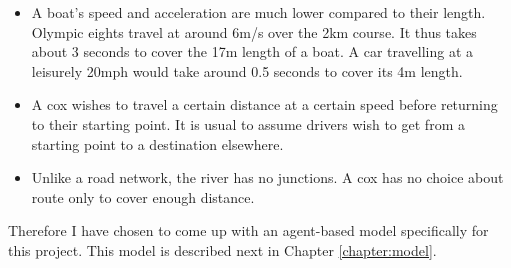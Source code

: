       \begin{itemize}
        \item A boat's speed and acceleration are much lower compared to their length. Olympic eights travel at around 6m/s over the 2km course. It thus takes about 3 seconds to cover the 17m length of a boat. A car travelling at a leisurely 20mph would take around 0.5 seconds to cover its 4m length.
        
        \item A cox wishes to travel a certain distance at a certain speed before returning to their starting point. It is usual to assume drivers wish to get from a starting point to a destination elsewhere. 
        
        \item Unlike a road network, the river has no junctions. A cox has no choice about route only to cover enough distance.
      \end{itemize}
  
  Therefore I have chosen to come up with an agent-based model specifically for this project. This model is described next in Chapter \ref{chapter:model}.
  
